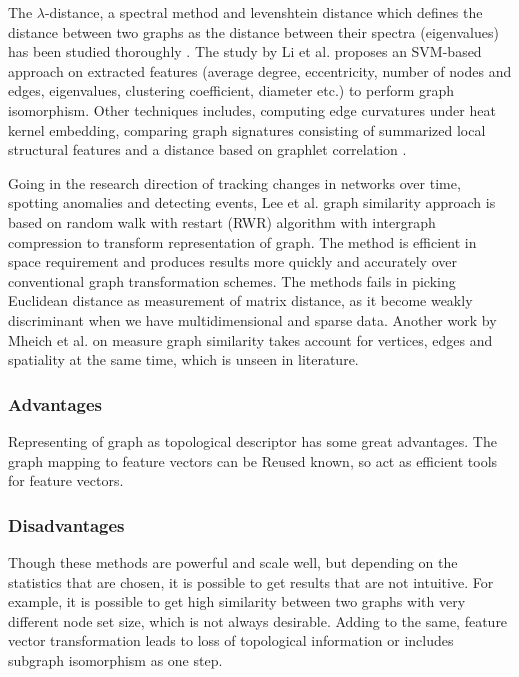 The $\lambda$-distance, a spectral method and levenshtein distance which defines the distance between two graphs as the distance between their spectra (eigenvalues) has been studied thoroughly \citep{Koutra2015}. The study by Li et al.\citep{Li2012} proposes an SVM-based approach on extracted features (average degree, eccentricity, number of nodes and edges, eigenvalues, clustering coefficient, diameter etc.) to perform graph isomorphism. Other techniques includes, computing edge curvatures under heat kernel embedding, comparing graph signatures consisting of
summarized local structural features  and a distance based on graphlet correlation \citep{Koutra2015}.


Going in the research direction of tracking changes in networks over time, spotting anomalies and detecting events, Lee et al.\citep{Lee2015} graph similarity approach is based on random walk with restart (RWR) algorithm with intergraph compression to transform representation of graph. The method is efficient in space requirement and produces results more quickly and accurately over conventional graph transformation schemes. The methods fails in picking Euclidean distance as measurement of matrix distance, as it become weakly discriminant when we have multidimensional and sparse data. Another work by Mheich et al. \citep{Mheich2015} on measure graph similarity takes account for vertices, edges and spatiality at the same time, which is unseen in literature.

\subsubsection{Advantages}
Representing of graph as topological descriptor has some great advantages. The graph mapping to feature vectors can be  Reused known, so act as efficient tools for feature vectors.

\subsubsection{Disadvantages}

Though these methods are powerful and scale well, but depending
on the statistics that are chosen, it is possible to get results that are not intuitive. For example, it is possible to get high similarity between two graphs with very different node set size, which is not always desirable. Adding to the same, feature vector transformation leads to loss of topological information or includes subgraph isomorphism as
one step.

